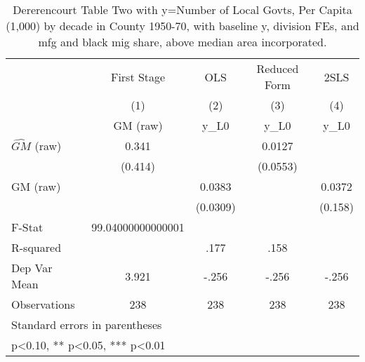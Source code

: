\begin{table}[htbp]\centering
\def\sym#1{\ifmmode^{#1}\else\(^{#1}\)\fi}
\caption{Dererencourt Table Two with y=Number of Local Govts, Per Capita (1,000) by decade in County 1950-70, with baseline y, division FEs, and mfg and black mig share, above median area incorporated.}
\begin{tabular}{l*{4}{c}}
\toprule
                    & First Stage   &         OLS   &Reduced Form   &        2SLS   \\
                    &\multicolumn{1}{c}{(1)}&\multicolumn{1}{c}{(2)}&\multicolumn{1}{c}{(3)}&\multicolumn{1}{c}{(4)}\\
                    &\multicolumn{1}{c}{GM  (raw)}&\multicolumn{1}{c}{y\_L0}&\multicolumn{1}{c}{y\_L0}&\multicolumn{1}{c}{y\_L0}\\
\midrule
$\hat{GM}$ (raw)    &       0.341   &               &      0.0127   &               \\
                    &     (0.414)   &               &    (0.0553)   &               \\
\addlinespace
GM  (raw)           &               &      0.0383   &               &      0.0372   \\
                    &               &    (0.0309)   &               &     (0.158)   \\
\midrule
F-Stat              &99.04000000000001   &               &               &               \\
R-squared           &               &        .177   &        .158   &               \\
Dep Var Mean        &       3.921   &       -.256   &       -.256   &       -.256   \\
Observations        &         238   &         238   &         238   &         238   \\
\bottomrule
\multicolumn{5}{l}{\footnotesize Standard errors in parentheses}\\
\multicolumn{5}{l}{\footnotesize * p<0.10, ** p<0.05, *** p<0.01}\\
\end{tabular}
\end{table}
